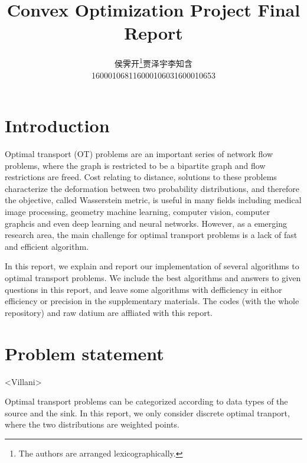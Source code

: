 \documentclass[english]{pkupaper}
\newcommand{\titlemark}{Convex Optimization Project Final Report}
\begin{document}
\DeclareRobustCommand{\authorthing}{%
\begin{tabular}{ccc}%
侯霁开\thanks{The authors are arranged lexicographically.} & 贾泽宇\thanksmark{1} & 李知含\thanksmark{1}\\%
1600010681 & 1600010603 & 1600010653%
\end{tabular}%
}
\title{\titlemark}
\author{\authorthing}

\maketitle

\section{Introduction}

Optimal transport (OT) problems are an important series of network flow problems, where the graph is restricted to be a bipartite graph and flow restrictions are freed. Cost relating to distance, solutions to these problems characterize the deformation between two probability distributions, and therefore the objective, called Wasserstein metric, is useful in many fields including medical image processing, geometry machine learning, computer vision, computer graphcis and even deep learning and neural networks. However, as a emerging research area, the main challenge for optimal transport problems is a lack of fast and efficient algorithm.

In this report, we explain and report our implementation of several algorithms to optimal transport problems. We include the best algorithms and answers to given questions in this report, and leave some algorithms with defficiency in eithor efficiency or precision in the supplementary materials. The codes (with the whole repository) and raw datium are affliated with this report.

\section{Problem statement}

<Villani>

Optimal transport problems can be categorized according to data types of the source and the sink. In this report, we only consider discrete optimal tranport, where the two distributions are weighted points.
\end{document}

